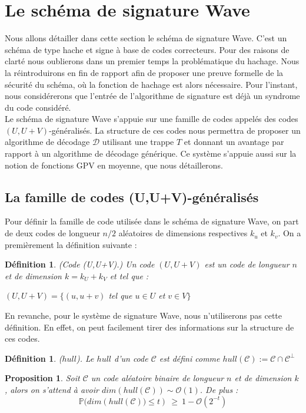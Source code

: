 \documentclass[12pt]{article}
\theoremstyle{plain}
\newtheorem{defi}[thm]{Définition}
\newtheorem{propo}[thm]{Proposition}
\begin{document}
\section{Le schéma de signature Wave}
Nous allons détailler dans cette section le schéma de signature Wave. C'est un schéma de type hache et signe à base de codes correcteurs. Pour des raisons de clarté nous oublierons dans un premier temps la problématique du hachage. Nous la réintroduirons en fin de rapport afin de proposer une preuve formelle de la sécurité du schéma, où la fonction de hachage est alors nécessaire. Pour l'instant, nous considérerons que l'entrée de l'algorithme de signature est déjà un syndrome du code considéré.\\
Le schéma de signature Wave s'appuie sur une famille de codes appelés des codes $(U,U+V)$-généralisés. La structure de ces codes nous permettra de proposer un algorithme de décodage $\mathcal{D}$ utilisant une trappe $T$ et donnant un avantage par rapport à un algorithme de décodage générique. Ce système s'appuie aussi sur la notion de fonctions GPV en moyenne, que nous détaillerons.

\subsection{La famille de codes (U,U+V)-généralisés}
Pour définir la famille de code utilisée dans le schéma de signature Wave, on part de deux codes de longueur $n/2$ aléatoires de dimensions respectives $k_u$ et $k_v$. On a premièrement la définition suivante :

\begin{defi}\label{UV} (Code (U,U+V).) Un code $(U,U+V)$ est un code de longueur $n$ et de dimension $k=k_U+k_V$ et tel que :
\begin{center}
$(U,U+V) = \{(u,u+v)$ tel que $u \in U$ et $v \in V \}$
\end{center}
\end{defi}


\noindent En revanche, pour le système de signature Wave, nous n'utiliserons pas cette définition. En effet, on peut facilement tirer des informations sur la structure de ces codes.\\


\begin{defi}($hull$).
Le  $hull$ d'un code $\mathcal{C}$ est défini comme $hull(\mathcal{C}) := \mathcal{C} \cap \mathcal{C}^{\bot}$
\end{defi}

\begin{propo}\label{dim_hull}
Soit $\mathcal{C}$ un code aléatoire binaire de longueur $n$ et de dimension $k$, alors on s'attend à avoir $dim(hull(\mathcal{C}))\sim\mathcal{O}(1)$. De plus : $$ \mathbb{P}\big(dim(hull(\mathcal{C})\big) \leq t) \ \geq\ 1 - \mathcal{O}(2^{-t}) $$
\end{propo}
\end{document}
